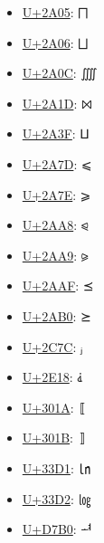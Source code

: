\begin{itemize}
	\item \href{https://decodeunicode.org/en/u+2A05}{U+2A05}: ⨅
	\item \href{https://decodeunicode.org/en/u+2A06}{U+2A06}: ⨆
	\item \href{https://decodeunicode.org/en/u+2A0C}{U+2A0C}: ⨌
	\item \href{https://decodeunicode.org/en/u+2A1D}{U+2A1D}: ⨝
	\item \href{https://decodeunicode.org/en/u+2A3F}{U+2A3F}: ⨿
	\item \href{https://decodeunicode.org/en/u+2A7D}{U+2A7D}: ⩽
	\item \href{https://decodeunicode.org/en/u+2A7E}{U+2A7E}: ⩾
	\item \href{https://decodeunicode.org/en/u+2AA8}{U+2AA8}: ⪨
	\item \href{https://decodeunicode.org/en/u+2AA9}{U+2AA9}: ⪩
	\item \href{https://decodeunicode.org/en/u+2AAF}{U+2AAF}: ⪯
	\item \href{https://decodeunicode.org/en/u+2AB0}{U+2AB0}: ⪰
	\item \href{https://decodeunicode.org/en/u+2C7C}{U+2C7C}: ⱼ
	\item \href{https://decodeunicode.org/en/u+2E18}{U+2E18}: ⸘
	\item \href{https://decodeunicode.org/en/u+301A}{U+301A}: 〚
	\item \href{https://decodeunicode.org/en/u+301B}{U+301B}: 〛
	\item \href{https://decodeunicode.org/en/u+33D1}{U+33D1}: ㏑
	\item \href{https://decodeunicode.org/en/u+33D2}{U+33D2}: ㏒
	\item \href{https://decodeunicode.org/en/u+D7B0}{U+D7B0}: ힰ
\end{itemize}